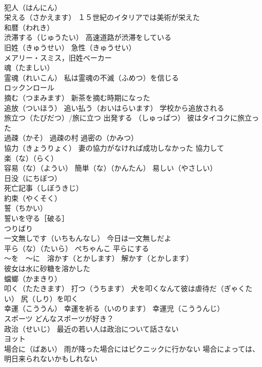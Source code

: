 \documentclass[8pt]{extreport}
\begin{document}
\begin{CJK}{UTF8}{min}
\\	犯人（はんにん）
\\	栄える（さかえます） １５世紀のイタリアでは美術が栄えた
\\	和暦（われき）
\\	渋滞する（じゅうたい） 高速道路が渋滞をしている
\\	旧姓（きゅうせい） 急性（きゅうせい）
\\	メアリー・スミス，旧姓ベーカー
\\	魂（たましい）
\\	霊魂（れいこん） 私は霊魂の不滅（ふめつ）を信じる
\\	ロックンロール
\\	摘む（つまみます） 新茶を摘む時期になった
\\	追放（ついほう） 追い払う（おいはらいます） 学校から追放される
\\	旅立つ（たびだつ）/旅に立つ 出発する （しゅっぱつ） 彼はタイコクに旅立った
\\	過疎（かそ） 過疎の村 過密の（かみつ）
\\	協力（きょうりょく） 妻の協力がなければ成功しなかった 協力して
\\	楽（な）（らく）
\\	容易（な）（ようい） 簡単（な）（かんたん） 易しい（やさしい）
\\	日没（にちぼつ）
\\	死亡記事（しぼうきじ）
\\	約束（やくそく） 
\\	誓（ちかい）　
\\	誓いを守る［破る］
\\	つりばり
\\	一文無しです（いちもんなし） 今日は一文無しだよ
\\	平ら（な）（たいら） ぺちゃんこ 平らにする
\\	～を　～に　溶かす（とかします） 解かす（とかします）
\\	彼女は水に砂糖を溶かした
\\	蟷螂（かまきり）
\\	叩く（たたきます） 打つ（うちます） 犬を叩くなんて彼は虐待だ（ぎゃくたい） 尻（しり）を叩く
\\	幸運（こううん） 幸運を祈る（いのります） 幸運児（こううんじ）
\\	スポーツ どんなスポーツが好き？
\\	政治（せいじ） 最近の若い人は政治について話さない
\\	ヨット
\\	場合に（ばあい） 雨が降った場合にはピクニックに行かない 場合によっては、明日来られないかもしれない

\end{CJK}
\end{document}
